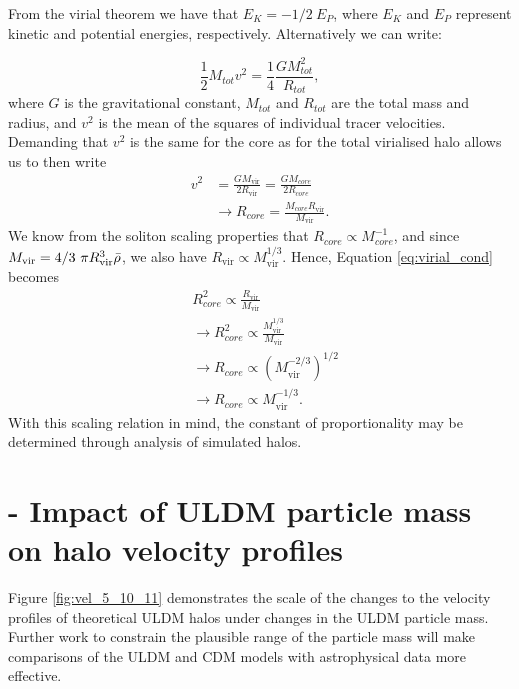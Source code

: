 \documentclass{pasa}%
\begin{document}
\begin{appendix}
From the virial theorem we have that $E_K=-1/2 \ E_P$, where $E_K$ and $E_P$ represent kinetic and potential energies, respectively. Alternatively we can write:

\begin{equation}
    \frac{1}{2}M_{tot}v^2=\frac{1}{4}\frac{GM_{tot}^2}{R_{tot}},
\end{equation}
where $G$ is the gravitational constant, $M_{tot}$ and $R_{tot}$ are the total mass and radius, and $v^2$ is the mean of the squares of individual tracer velocities. Demanding that $v^2$ is the same for the core as for the total virialised halo allows us to then write
\begin{align}\label{eq:virial_cond}
    v^2&=\frac{GM_{\mathrm{vir}}}{2 R_{\mathrm{vir}}}=\frac{G M_{core}}{2 R_{core}}\nonumber\\
    &\rightarrow R_{core}=\frac{M_{core} R_{\mathrm{vir}}}{M_{\mathrm{vir}}}.
\end{align}
We know from the soliton scaling properties that $R_{core}\propto M_{core}^{-1}$, and since $M_{\mathrm{vir}}=4/3 \ \pi R_{\mathrm{vir}}^3 \Bar{\rho}$, we also have $R_{\mathrm{vir}} \propto M_{\mathrm{vir}}^{1/3}$. Hence, Equation \ref{eq:virial_cond} becomes
\begin{align}
    &R_{core}^2\propto \frac{R_{\mathrm{vir}}}{M_{\mathrm{vir}}}\nonumber\\
    &\rightarrow R_{core}^2\propto \frac{M_{\mathrm{vir}}^{1/3}}{M_{\mathrm{vir}}}\nonumber\\
    &\rightarrow R_{core}\propto\left(M_{\mathrm{vir}}^{-2/3}\right)^{1/2}\nonumber\\
    &\rightarrow R_{core}\propto M_{\mathrm{vir}}^{-1/3}.
\end{align}
With this scaling relation in mind, the constant of proportionality may be determined through analysis of simulated halos. 



\section{ - Impact of ULDM particle mass on halo velocity profiles}

Figure \ref{fig:vel_5_10_11} demonstrates the scale of the changes to the velocity profiles of theoretical ULDM halos under changes in the ULDM particle mass. Further work to constrain the plausible range of the particle mass will make comparisons of the ULDM and CDM models with astrophysical data more effective.

 
\end{appendix}



\end{document}
